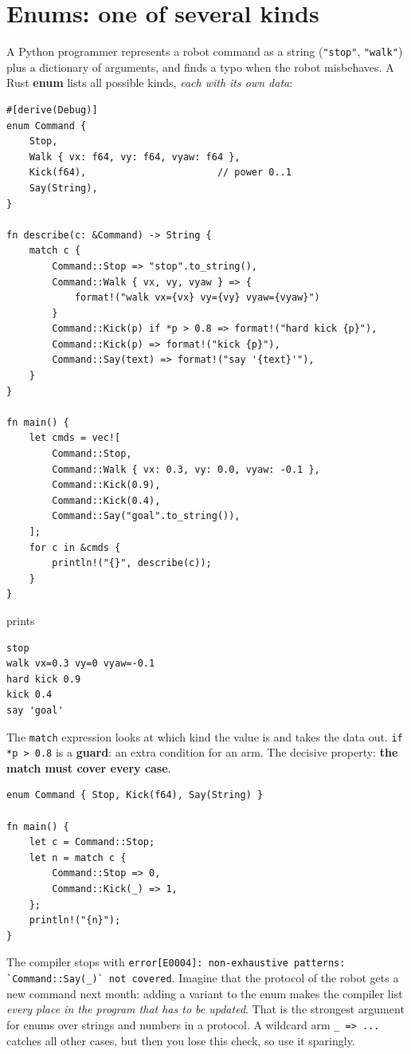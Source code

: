 \section*{Enums: one of several kinds}
A Python programmer represents a robot command as a string (\verb!"stop"!, \verb!"walk"!) plus a dictionary of arguments, and finds a typo when the robot misbehaves. A Rust \textbf{enum} lists all possible kinds, \emph{each with its own data}:
\begin{verbatim}
#[derive(Debug)]
enum Command {
    Stop,
    Walk { vx: f64, vy: f64, vyaw: f64 },
    Kick(f64),                       // power 0..1
    Say(String),
}

fn describe(c: &Command) -> String {
    match c {
        Command::Stop => "stop".to_string(),
        Command::Walk { vx, vy, vyaw } => {
            format!("walk vx={vx} vy={vy} vyaw={vyaw}")
        }
        Command::Kick(p) if *p > 0.8 => format!("hard kick {p}"),
        Command::Kick(p) => format!("kick {p}"),
        Command::Say(text) => format!("say '{text}'"),
    }
}

fn main() {
    let cmds = vec![
        Command::Stop,
        Command::Walk { vx: 0.3, vy: 0.0, vyaw: -0.1 },
        Command::Kick(0.9),
        Command::Kick(0.4),
        Command::Say("goal".to_string()),
    ];
    for c in &cmds {
        println!("{}", describe(c));
    }
}
\end{verbatim}
prints
\begin{verbatim}
stop
walk vx=0.3 vy=0 vyaw=-0.1
hard kick 0.9
kick 0.4
say 'goal'
\end{verbatim}
The \verb!match! expression looks at which kind the value is and takes the data out. \verb!if *p > 0.8! is a \textbf{guard}: an extra condition for an arm. The decisive property: \textbf{the match must cover every case}.
\begin{verbatim}
enum Command { Stop, Kick(f64), Say(String) }

fn main() {
    let c = Command::Stop;
    let n = match c {
        Command::Stop => 0,
        Command::Kick(_) => 1,
    };
    println!("{n}");
}
\end{verbatim}
The compiler stops with \verb!error[E0004]: non-exhaustive patterns: `Command::Say(_)` not covered!. Imagine that the protocol of the robot gets a new command next month: adding a variant to the enum makes the compiler list \emph{every place in the program that has to be updated}. That is the strongest argument for enums over strings and numbers in a protocol. A wildcard arm \verb!_ => ...! catches all other cases, but then you lose this check, so use it sparingly.

